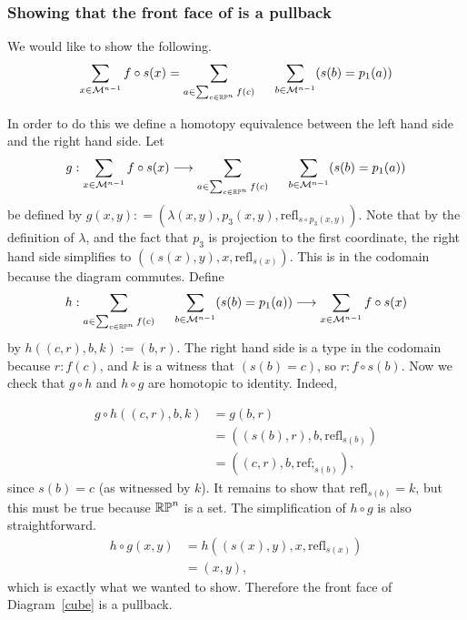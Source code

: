 \documentclass{amsart}
\begin{document}
\subsubsection{Showing that the front face of is a pullback}

 We would like to show the following.
 \[
 \displaystyle\sum_{x \in \mathcal{M}^{n-1}} f\circ s (x) = \displaystyle\sum_{a \in \sum_{c \in \mathbb{RP}^n}f(c)} \hspace {0.5cm}\displaystyle\sum_{b \in \mathcal{M}^{n-1}} (s(b) =p_1(a))
 \]
 
 In order to do this we define a homotopy equivalence between the left hand side and the right hand side. Let
 \[
 g:  \displaystyle\sum_{x \in \mathcal{M}^{n-1}} f\circ s (x) \longrightarrow \displaystyle\sum_{a \in \sum_{c \in \mathbb{RP}^n}f(c)} \hspace {0.5cm}\displaystyle\sum_{b \in \mathcal{M}^{n-1}} (s(b) =p_1(a))
 \]
 be defined by $g (x, y) : = (\lambda(x, y), p_3(x, y), \text{refl}_{s\circ p_3(x,y)})$. Note that by the definition of $\lambda$, and the fact that $p_3$ is projection to the first coordinate, the right hand side simplifies to $((s(x), y), x, \text{refl}_{s(x)})$. This is in the codomain because the diagram commutes. Define
  \[
 h: \displaystyle\sum_{a \in \sum_{c \in \mathbb{RP}^n}f(c)} \hspace {0.5cm}\displaystyle\sum_{b \in \mathcal{M}^{n-1}} (s(b) =p_1(a)) \longrightarrow  \displaystyle\sum_{x \in \mathcal{M}^{n-1}} f\circ s (x) 
 \]
by $h((c,r), b, k) := (b, r)$. The right hand side is a type in the codomain because $r : f(c)$, and $k$ is a witness that $(s(b)=c)$, so $r: f \circ s(b)$. Now we check that  $g\circ h$ and $h \circ g$ are homotopic to identity. Indeed,

\begin{align*}
g \circ h((c, r), b, k)	& = g(b, r) \\
				& = ((s(b), r), b, \text{refl}_{s(b)})\\
				& = ((c,r), b, \text{ref;}_{s(b)}),
\end{align*}
since $s(b) = c$ (as witnessed by $k$). It remains to show that $\text{refl}_{s(b)}=k$, but this must be true because $\mathbb{RP}^n$ is a set. The simplification of $h \circ g$ is also straightforward.
\begin{align*}
h \circ g (x, y)	& = h((s(x), y), x, \text{refl}_{s(x)})\\
			& = (x, y),
\end{align*}
which is exactly what we wanted to show.  Therefore the front face of Diagram~\ref{cube} is a pullback.
\end{document}
